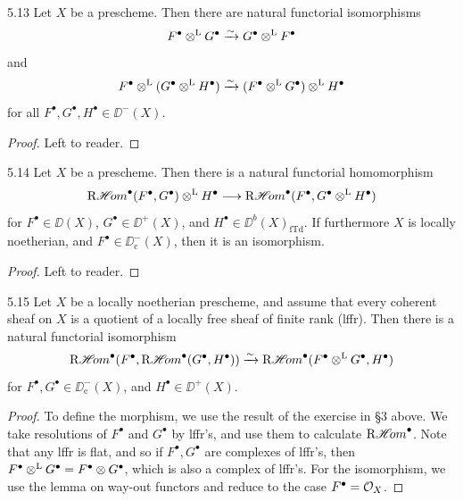 \begin{bookproposition}{5.13}\label{prop:2.5.13}
Let $X$ be a prescheme. Then there are natural functorial isomorphisms
\[
F^\bullet\mathbin{\otimes^{\mathrm{L}}} G^\bullet \xrightarrow{\sim} G^\bullet\mathbin{\otimes^{\mathrm{L}}} F^\bullet
\]
and
\[
F^\bullet\mathbin{\otimes^{\mathrm{L}}} (G^\bullet\mathbin{\otimes^{\mathrm{L}}} H^\bullet) \xrightarrow{\sim} (F^\bullet\mathbin{\otimes^{\mathrm{L}}} G^\bullet)\mathbin{\otimes^{\mathrm{L}}} H^\bullet
\]
for all $F^\bullet,G^\bullet,H^\bullet\in\DD^-(X)$.
\end{bookproposition}

\begin{proof}
Left to reader.
\end{proof}

\begin{bookproposition}{5.14}\label{prop:2.5.14}
Let $X$ be a prescheme. Then there is a natural functorial homomorphism
\[
\mathop{\mathrm{R}\mathscr{H}\!om}\nolimits^\bullet(F^\bullet,G^\bullet)\mathbin{\otimes^{\mathrm{L}}} H^\bullet \longrightarrow \mathop{\mathrm{R}\mathscr{H}\!om}\nolimits^\bullet(F^\bullet, G^\bullet\mathbin{\otimes^{\mathrm{L}}} H^\bullet)
\]
for $F^\bullet\in\DD(X)$, $G^\bullet\in\DD^+(X)$, and $H^\bullet\in\DD^b(X)_{\mathrm{fTd}}$. If furthermore $X$ is locally noetherian, and $F^\bullet\in\DD_{\mathrm{c}}^-(X)$, then it is an isomorphism.
\end{bookproposition}

\begin{proof}
Left to reader.
\end{proof}

\begin{bookproposition}{5.15}\label{prop:2.5.15}
Let $X$ be a locally noetherian prescheme, and assume that every coherent sheaf on $X$ is a quotient of a locally free sheaf of finite rank (lffr). Then there is a natural functorial isomorphism
\[
\mathop{\mathrm{R}\mathscr{H}\!om}\nolimits^\bullet(F^\bullet, \mathop{\mathrm{R}\mathscr{H}\!om}\nolimits^\bullet(G^\bullet, H^\bullet)) \xrightarrow{\sim} \mathop{\mathrm{R}\mathscr{H}\!om}\nolimits^\bullet(F^\bullet\mathbin{\otimes^{\mathrm{L}}} G^\bullet, H^\bullet)
\]
for $F^\bullet,G^\bullet\in\DD_{\mathrm{c}}^-(X)$, and $H^\bullet\in\DD^+(X)$.
\end{bookproposition}

\begin{proof}
To define the morphism, we use the result of the exercise in \S3 above. We take resolutions of $F^\bullet$ and $G^\bullet$ by lffr's, and use them to calculate $\mathop{\mathrm{R}\mathscr{H}\!om}\nolimits^\bullet$. Note that any lffr is flat, and so if $F^\bullet,G^\bullet$ are complexes of lffr's, then $F^\bullet\mathbin{\otimes^{\mathrm{L}}} G^\bullet=F^\bullet\otimes G^\bullet$, which is also a complex of lffr's. For the isomorphism, we use the lemma on way-out functors and reduce to the case $F^\bullet=\mathcal{O}_X$.
\end{proof}

